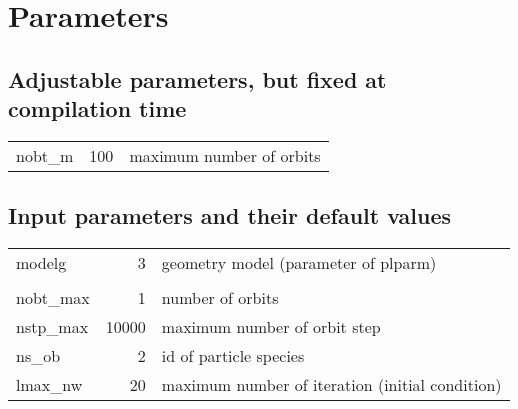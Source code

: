 \documentclass[11pt]{article}
\begin{document}
\section{Parameters}

\subsection{Adjustable parameters, but fixed at compilation time}

\begin{center}
  \begin{tabular}{lrl}
    nobt\_m & 100 & maximum number of orbits
  \end{tabular}
\end{center}

\subsection{Input parameters and their default values}

\begin{center}
  \begin{tabular}{lrl}
    modelg & 3 & geometry model (parameter of plparm) \\
    \\
    nobt\_max &     1 & number of orbits \\
    nstp\_max & 10000 & maximum number of orbit step \\
    ns\_ob    &     2 & id of particle species \\
    lmax\_nw  &    20 & maximum number of iteration (initial
    condition)
  \end{tabular}
\end{center}
\end{document}
